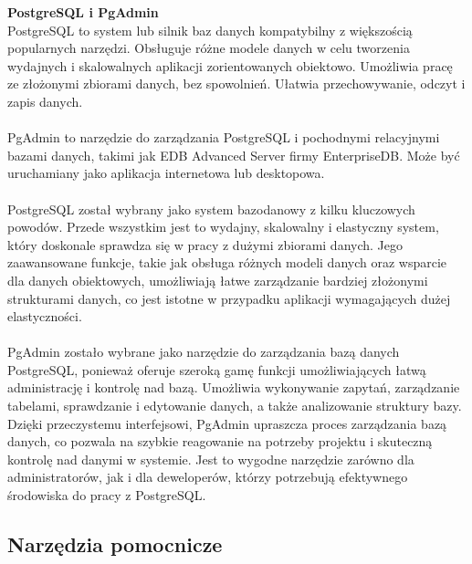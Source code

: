 \documentclass[12pt,a4paper]{article}
\begin{document}
\noindent \textbf{PostgreSQL i PgAdmin}\\
PostgreSQL to system lub silnik baz danych kompatybilny z większością popularnych narzędzi. Obsługuje różne modele danych w celu tworzenia wydajnych i skalowalnych aplikacji zorientowanych obiektowo. Umożliwia pracę ze złożonymi zbiorami danych, bez spowolnień. Ułatwia przechowywanie, odczyt i zapis danych.
\\\\
PgAdmin to narzędzie do zarządzania PostgreSQL i pochodnymi relacyjnymi bazami danych, takimi jak EDB Advanced Server firmy EnterpriseDB. Może być uruchamiany jako aplikacja internetowa lub desktopowa.
\\\\
PostgreSQL został wybrany jako system bazodanowy z kilku kluczowych powodów. Przede wszystkim jest to wydajny, skalowalny i elastyczny system, który doskonale sprawdza się w pracy z dużymi zbiorami danych. Jego zaawansowane funkcje, takie jak obsługa różnych modeli danych oraz wsparcie dla danych obiektowych, umożliwiają łatwe zarządzanie bardziej złożonymi strukturami danych, co jest istotne w przypadku aplikacji wymagających dużej elastyczności.
\\\\
PgAdmin zostało wybrane jako narzędzie do zarządzania bazą danych PostgreSQL, ponieważ oferuje szeroką gamę funkcji umożliwiających łatwą administrację i kontrolę nad bazą. Umożliwia wykonywanie zapytań, zarządzanie tabelami, sprawdzanie i edytowanie danych, a także analizowanie struktury bazy. Dzięki przeczystemu interfejsowi, PgAdmin upraszcza proces zarządzania bazą danych, co pozwala na szybkie reagowanie na potrzeby projektu i skuteczną kontrolę nad danymi w systemie. Jest to wygodne narzędzie zarówno dla administratorów, jak i dla deweloperów, którzy potrzebują efektywnego środowiska do pracy z PostgreSQL.

\subsection{Narzędzia pomocnicze}
\end{document}
